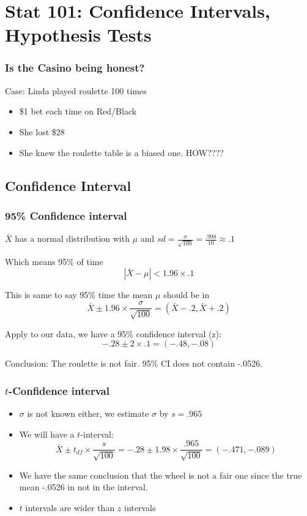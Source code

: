 \documentclass[
  ignorenonframetext,
]{beamer}
\begin{document}
\hypertarget{stat-101-confidence-intervals-hypothesis-tests}{%
\section{Stat 101: Confidence Intervals, Hypothesis
Tests}\label{stat-101-confidence-intervals-hypothesis-tests}}

\begin{frame}
\frametitle{Is the Casino being honest?}

Case: Linda played roulette 100 times

\begin{itemize}
\item
  \$1 bet each time on Red/Black
\item
  She lost \$28
\item
  She knew the roulette table is a biased one. HOW????
\end{itemize}

\footnotesize
\end{frame}

\hypertarget{confidence-interval}{%
\subsection{Confidence Interval}\label{confidence-interval}}

\begin{frame}
\frametitle{95\% Confidence interval}

\(\bar{X}\) has a normal distribution with \(\mu\) and
\(sd =\frac{\sigma}{\sqrt{100}} = \frac{.998}{10} \approx .1\)

Which means 95\% of time \[|\bar{X} - \mu| < 1.96 \times .1\]

This is same to say 95\% time the mean \(\mu\) should be in
\[\bar{X} \pm 1.96 \times \frac{\sigma}{\sqrt{100}} = (\bar{X} - .2, \bar{X} + .2)\]

Apply to our data, we have a 95\% confidence interval (z):
\[-.28 \pm 2\times .1 = (-.48, -.08)\]

Conclusion: The roulette is not fair. 95\% CI does not contain -.0526.
\end{frame}

\begin{frame}
\frametitle{$t$-Confidence interval}

\begin{itemize}
\item
  \(\sigma\) is not known either, we estimate \(\sigma\) by \(s=.965\)
\item
  We will have a \(t\)-interval:
  \[\bar{X} \pm t_{df} \times \frac{s}{\sqrt{100}} = -.28 \pm 1.98 \times \frac{.965}{\sqrt{100}} = (-.471, -.089)\]
\item
  We have the same conclusion that the wheel is not a fair one since the
  true mean -.0526 in not in the interval.
\item
  \(t\) intervals are wider than \(z\) intervals
\end{itemize}
\end{frame}
\end{document}
